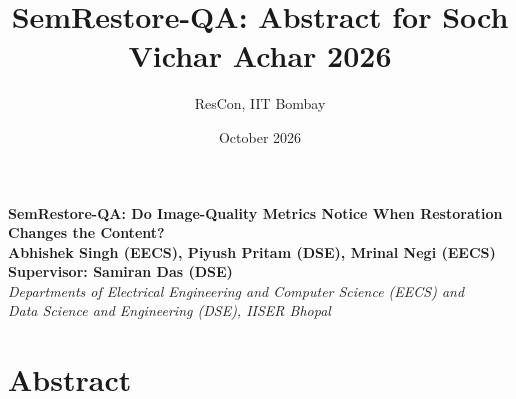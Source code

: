 \documentclass{article}
\title{SemRestore-QA: Abstract for Soch Vichar Achar 2026}
\author{ResCon, IIT Bombay}
\date{October 2026}
\begin{document}
\begin{center}
\textbf{\Large SemRestore-QA: Do Image-Quality Metrics Notice When Restoration Changes the Content?} \\[2em]
\textbf{Abhishek Singh (EECS), Piyush Pritam (DSE), Mrinal Negi (EECS)} \\[0.5em]
\textbf{Supervisor: Samiran Das (DSE)} \\[0.8em]
\textit{Departments of Electrical Engineering and Computer Science (EECS) and}\\
\textit{Data Science and Engineering (DSE), IISER Bhopal}
\end{center}

\vspace{2em}

\section*{Abstract}
\end{document}
